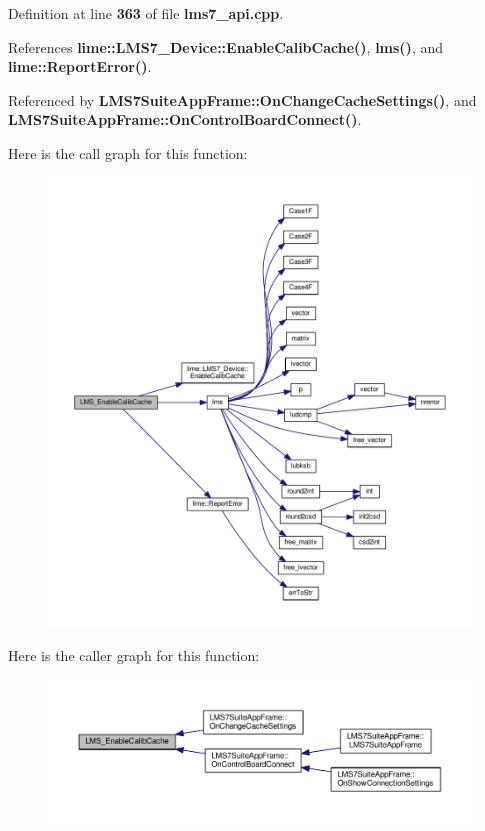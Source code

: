 Definition at line {\bf 363} of file {\bf lms7\+\_\+api.\+cpp}.



References {\bf lime\+::\+L\+M\+S7\+\_\+\+Device\+::\+Enable\+Calib\+Cache()}, {\bf lms()}, and {\bf lime\+::\+Report\+Error()}.



Referenced by {\bf L\+M\+S7\+Suite\+App\+Frame\+::\+On\+Change\+Cache\+Settings()}, and {\bf L\+M\+S7\+Suite\+App\+Frame\+::\+On\+Control\+Board\+Connect()}.



Here is the call graph for this function\+:
\nopagebreak
\begin{figure}[H]
\begin{center}
\leavevmode
\includegraphics[width=350pt]{df/de1/lms7__api_8cpp_a874c42499ec6b140f9037f7b3d9ddc8b_cgraph}
\end{center}
\end{figure}




Here is the caller graph for this function\+:
\nopagebreak
\begin{figure}[H]
\begin{center}
\leavevmode
\includegraphics[width=350pt]{df/de1/lms7__api_8cpp_a874c42499ec6b140f9037f7b3d9ddc8b_icgraph}
\end{center}
\end{figure}


